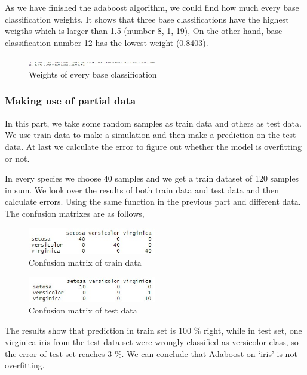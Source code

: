 \documentclass[../SMLreport_template.tex]{subfiles}
\begin{document}
As we have finished the adaboost algorithm, we could find how much every base classification weights. It shows that three base classifications have the highest weigths which is larger than 1.5 (number 8, 1, 19), On the other hand, base classification number 12 has the lowest weight (0.8403).\par
\begin{figure}[t]
    \centering
    \includegraphics[width=0.5\textwidth]{sections/images/Weights_steps.jpg}
    \caption{Weights of every base classification}
\end{figure}

\subsubsection{Making use of partial data}
In this part, we take some random samples as train data and others as test data. We use train data to make a simulation and then make a prediction on the test data. At last we calculate the error to figure out whether the model is overfitting or not.\par

In every species we choose 40 samples and we get a train dataset of 120 samples in sum. We look over the results of both train data and test data and then calculate errors. Using the same function in the previous part and different data. 
The confusion matrixes are as follows,\par
 \begin{figure}[t]
    \centering
    \includegraphics[width=0.5\textwidth]{sections/images/CM_of_train.jpg}
    \caption{Confusion matrix of train data}
\end{figure}

 \begin{figure}[t]
    \centering
    \includegraphics[width=0.5\textwidth]{sections/images/CM_of_test.jpg}
    \caption{Confusion matrix of test data}
\end{figure}
 
The results show that prediction in train set is 100 $\%$ right, while in test set, one virginica iris from the test data set were wrongly classified as versicolor class, so the error of test set reaches 3 $\%$. We can conclude that Adaboost on ‘iris’ is not overfitting.\par
\end{document}
